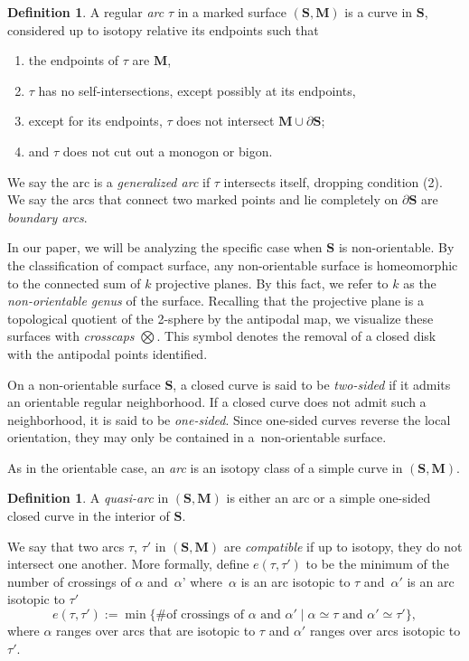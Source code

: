\documentclass[pdftex]{sigma}
\numberwithin{equation}{section}
\theoremstyle{definition}
\newtheorem{Definition}[Theorem]{Definition}
\newcommand{\SM}{(\mathbf{S}, \mathbf{M})}
\begin{document}
\begin{Definition}\label{definition::regulararc}
A regular \textit{arc} $\tau$ in a marked surface $\SM$ is a curve in $\mathbf{S}$, considered up to isotopy relative its endpoints such that
\begin{enumerate}\itemsep=0pt
 \item[(1)] the endpoints of $\tau$ are $\mathbf{M}$,
 \item[(2)] $\tau$ has no self-intersections, except possibly at its endpoints,
 \item[(3)] except for its endpoints, $\tau$ does not intersect $\mathbf{M} \cup \partial \mathbf{S}$;
 \item[(4)] and $\tau$ does not cut out a monogon or bigon.
\end{enumerate}
We say the arc is a \textit{generalized arc} if $\tau$ intersects itself, dropping condition (2). We say the arcs that connect two marked points and lie completely on $\partial \mathbf{S}$ are \textit{boundary arcs}.
\end{Definition}

In our paper, we will be analyzing the specific case when $\mathbf{S}$ is non-orientable. By the classification of compact surface, any non-orientable surface is homeomorphic to the connected sum of $k$ projective planes. By this fact, we refer to $k$ as the \textit{non-orientable genus} of the surface. Recalling that the projective plane is a topological quotient of the 2-sphere by the antipodal map, we visualize these surfaces with \textit{crosscaps} $\bigotimes$. This symbol denotes the removal of a closed disk with the antipodal points identified.

On a non-orientable surface $\mathbf{S}$, a closed curve is said to be \textit{two-sided} if it admits an orientable regular neighborhood. If a closed curve does not admit such a neighborhood, it is said to be \textit{one-sided}. Since one-sided curves reverse the local orientation, they may only be contained in a~non-orientable surface.

As in the orientable case, an \textit{arc} is an isotopy class of a simple curve in $(\mathbf{S},\mathbf{M})$.

\begin{Definition}\label{definition:quasiarc}
 A \textit{quasi-arc} in $(\mathbf{S},\mathbf{M})$ is either an arc or a simple one-sided closed curve in the interior of $\mathbf{S}$.
\end{Definition}

We say that two arcs $\tau$, $\tau'$ in $\SM$ are \textit{compatible} if up to isotopy, they do not intersect one another. More formally, define $e(\tau, \tau')$ to be the minimum of the number of crossings of $\alpha$ and~$\alpha$' where~$\alpha$ is an arc isotopic to $\tau$ and~$\alpha'$ is an arc isotopic to $\tau'$
\[e(\tau, \tau') := \min\{\# \text{of crossings of } \alpha \text{ and } \alpha' \mid \alpha \simeq \tau \text{ and } \alpha' \simeq \tau'\},\]
\noindent where $\alpha$ ranges over arcs that are isotopic to $\tau$ and $\alpha'$ ranges over arcs isotopic to $\tau'$.
\end{document}
